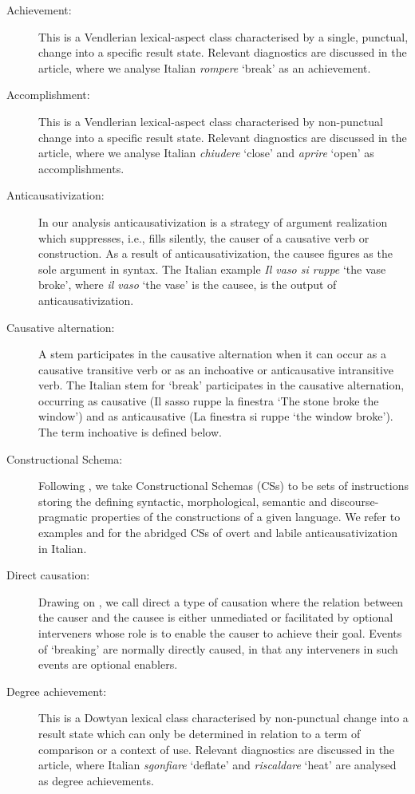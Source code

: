\documentclass[output=paper,colorlinks,citecolor=brown
]{langscibook}
\begin{document}
\begin{description}\sloppy
\item[Achievement:]  This is a Vendlerian   lexical-aspect class characterised by a single, punctual, change into a specific   result state. Relevant diagnostics are discussed in the article, where we   analyse Italian \textit{rompere} ‘break’ as an achievement.   
\item[Accomplishment:]  This is a Vendlerian   lexical-aspect class characterised by non-punctual change into a specific result   state. Relevant diagnostics are discussed in the article, where we analyse Italian   \textit{chiudere} ‘close’ and \textit{aprire} ‘open’ as accomplishments. 
\item[Anticausativization:]  In our analysis anticausativization   is a strategy of argument realization which suppresses, i.e., fills   silently, the causer of a causative verb or construction. As a result of anticausativization,   the causee figures as the sole argument in syntax. The Italian example \textit{Il   vaso si ruppe} ‘the vase broke’, where \textit{il vaso} ‘the vase’ is the   causee, is the output of anticausativization. 
\item[Causative   alternation:]  A stem participates in the causative   alternation when it can occur as a causative transitive verb or as an   inchoative or anticausative intransitive verb. The Italian stem for ‘break’   participates in the causative alternation, occurring as causative (Il sasso   ruppe la finestra ‘The stone broke the window’) and as anticausative (La   finestra si ruppe ‘the window broke’). The term inchoative   is defined below. 
\item[Constructional   Schema:]  Following \citet{vanvalin2023principles}, we   take Constructional Schemas (CSs) to be sets of instructions storing   the defining syntactic, morphological, semantic and discourse-pragmatic   properties of the constructions of a given language. We refer to examples    and  for the abridged CSs of overt and labile anticausativization in   Italian.   
\item[Direct   causation:]  Drawing on \citet{wolff2003direct}, we call direct   a type of causation where the relation between the causer and the causee is   either unmediated or facilitated by optional interveners whose role is to   enable the causer to achieve their goal. Events of ‘breaking’ are normally   directly caused, in that any interveners in such events are optional   enablers. 
\item[Degree   achievement:]  This is a Dowtyan lexical class   characterised by non-punctual change into a result state which can only be   determined in relation to a term of comparison or a context of use. Relevant   diagnostics are discussed in the article, where Italian \textit{sgonfiare}   ‘deflate’ and \textit{riscaldare} ‘heat’ are analysed as degree achievements.                 

\end{description}
\end{document}
